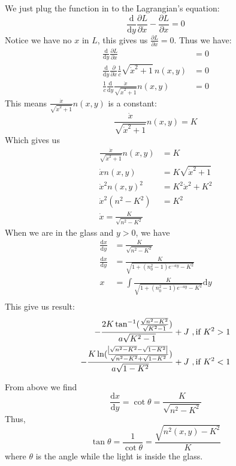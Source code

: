 \documentclass{article}
\newcommand{\de}{\mathrm{d}}
\begin{document}
\begin{enumerate}
\begin{enumerate}
        We just plug the function in to the Lagrangian's equation:
        \[
            \frac{\de}{\de y} \frac{\partial L}{\partial \dot x} - \frac{\partial L}{\partial x} = 0
        \]
        Notice we have no $x$ in $L$, this gives us $\frac{\partial L}{\partial x} = 0$. Thus we have:
        \begin{align*}
            \frac{\de}{\de y} \frac{\partial L}{\partial \dot x} &= 0 \\
            \frac{\de}{\de y} \frac{\partial}{\partial \dot x} \frac{1}{c}\sqrt{\dot x^2 + 1}\,n(x,y) &= 0\\
            \frac{1}{c}\frac{\de}{\de y} \frac{\dot x}{\sqrt{\dot x^2 + 1}}n(x,y) &= 0
        \end{align*}
        This means $\frac{\dot x}{\sqrt{\dot x^2 + 1}}n(x,y)$ is a constant:
        \[
        \frac{\dot x}{\sqrt{\dot x^2 + 1}}n(x,y) = K
        \]
        Which gives us
        \begin{align*}
            \frac{\dot x}{\sqrt{\dot x^2 + 1}}n(x,y) &= K \\
            \dot x n(x,y) &= K \sqrt{\dot x^2 + 1} \\
            \dot x^2 n(x,y)^2 &= K^2 \dot x^2 + K^2\\
            \dot x^2 (n^2 - K^2) &= K^2 \\
            \dot x = \frac{K}{\sqrt{n^2 - K^2}}
        \end{align*}
        When we are in the glass and $y > 0$, we have
        \begin{align*}
            \frac{\de x}{\de y} &= \frac{K}{\sqrt{n^2 - K^2}} \\
            \frac{\de x}{\de y} &= \frac{K}{\sqrt{1+(n_0^2-1)e^{-ay} - K^2}} \\
            x &= \int \frac{K}{\sqrt{1+(n_0^2-1)e^{-ay} - K^2}} \de y\\
        \end{align*}
        This give us result:
        \begin{align*}
            -\frac{2K \tan^{-1}(\frac{\sqrt{n^2-K^2}}{\sqrt{K^2-1}})}{a\sqrt{K^2 - 1}} + J \ ,\text{if } K^2 > 1\\
            -\frac{K \ln (\frac{\abs{\sqrt{n^2-K^2} - \sqrt{1-K^2}}}{\sqrt{n^2-K^2}+\sqrt{1-K^2}})}{a\sqrt{1-K^2}} + J\ ,\text{if }K^2 < 1
        \end{align*}

        From above we find
        \[
        \frac{\de x}{\de y} = \cot \theta = \frac{K}{\sqrt{n^2-K^2}}
        \]
        Thus,
        \[
        \tan \theta = \frac{1}{\cot \theta} = \frac{\sqrt{n^2(x,y)-K^2}}{K}
        \]
        where $\theta$ is the angle while the light is inside the glass.


\end{enumerate}
\end{enumerate}
\end{document}
